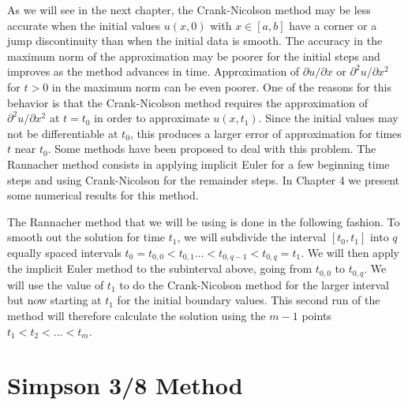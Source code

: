 \documentclass[00main.tex]{subfiles}
\begin{document}
As we will see in the next chapter, the Crank-Nicolson method may be less accurate when the initial values $u(x,0)$ with $x\in [a,b]$ have a corner or a jump discontinuity than when the initial data is smooth. The accuracy in the maximum norm of the approximation may be poorer for the initial steps and improves as the method advances in time. Approximation of $\partial u/\partial x $ or $\partial^2 u/\partial x^2 $ for $t>0$ in the maximum norm can be even poorer. One of the reasons for this behavior is that the Crank-Nicolson method requires the approximation of $\partial^2 u/\partial x^2 $ at $t=t_0$ in order to approximate $u(x,t_1)$. Since the initial values may not be differentiable at $t_0$, this produces a larger error of approximation for times $t$ near $t_0$. Some methods have been proposed to deal with this problem. The Rannacher method \cite{rannacher} consists in applying implicit Euler for a few beginning time steps and using Crank-Nicolson for the remainder steps. In Chapter 4 we present some numerical results for this method.

The Rannacher method that we will be using is done in the following fashion. To smooth out the solution for time $t_1$, we will subdivide the interval $[t_0, t_1]$ into $q$ equally spaced intervals $t_0 = t_{0,0} < t_{0,1} \hdots < t_{0,q-1} < t_{0,q} = t_1$. %
We will then apply the implicit Euler method to the subinterval above, going from $ t_{0,0}$ to $t_{0,q}$. We will use the value of $t_1$ to do the Crank-Nicolson method for the larger interval but now starting at $ t_1$ for the initial boundary values. This second run of the method will therefore calculate the solution using the $m-1$ points $t_1 < t_2 < \hdots < t_m$.






\section{Simpson 3/8 Method}
\end{document}
